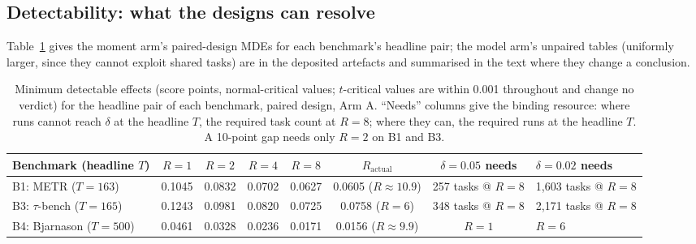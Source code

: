 \documentclass[11pt]{article}
\begin{document}
\subsection{Detectability: what the designs can resolve}

Table~\ref{tab:mde} gives the moment arm's paired-design MDEs for each
benchmark's headline pair; the model arm's unpaired tables (uniformly
larger, since they cannot exploit shared tasks) are in the deposited
artefacts and summarised in the text where they change a conclusion.

\begin{table}[t]
\centering\small
\begin{tabular}{@{}lccccccl@{}}
\toprule
Benchmark (headline $T$) & $R{=}1$ & $R{=}2$ & $R{=}4$ & $R{=}8$ & $R_{\mathrm{actual}}$ & $\delta{=}0.05$ needs & $\delta{=}0.02$ needs \\
\midrule
B1: METR ($T{=}163$) & 0.1045 & 0.0832 & 0.0702 & 0.0627 & 0.0605 ($R{\approx}10.9$) & 257 tasks @ $R{=}8$ & 1,603 tasks @ $R{=}8$ \\
B3: $\tau$-bench ($T{=}165$) & 0.1243 & 0.0981 & 0.0820 & 0.0725 & 0.0758 ($R{=}6$) & 348 tasks @ $R{=}8$ & 2,171 tasks @ $R{=}8$ \\
B4: Bjarnason ($T{=}500$) & 0.0461 & 0.0328 & 0.0236 & 0.0171 & 0.0156 ($R{\approx}9.9$) & $R{=}1$ & $R{=}6$ \\
\bottomrule
\end{tabular}
\caption{Minimum detectable effects (score points, normal-critical
values; $t$-critical values are within 0.001 throughout and change no
verdict) for the headline pair of each benchmark, paired design, Arm
A. ``Needs'' columns give the binding resource: where runs cannot
reach $\delta$ at the headline $T$, the required task count at $R=8$;
where they can, the required runs at the headline $T$. A 10-point gap
needs only $R = 2$ on B1 and B3.}
\label{tab:mde}
\end{table}
\end{document}
